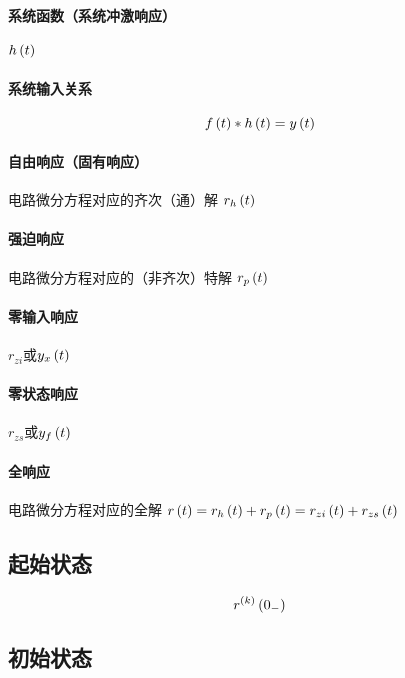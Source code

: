 \documentclass{article}
\begin{document}
\paragraph{系统函数（系统冲激响应）}

$h\left(t\right)$

\paragraph{系统输入关系}

\[f\left(t\right)\ast h\left(t\right)=y\left(t\right)\]

\paragraph{自由响应（固有响应）}

电路微分方程对应的齐次（通）解
$r_h\left(t\right)$

\paragraph{强迫响应}

电路微分方程对应的（非齐次）特解
$r_p\left(t\right)$

\paragraph{零输入响应}

$r_{zi}$或$y_x\left(t\right)$

\paragraph{零状态响应}

$r_{zs}$或$y_f\left(t\right)$

\paragraph{全响应}

电路微分方程对应的全解
$r\left(t\right)=r_h\left(t\right)+r_p\left(t\right)=r_{zi}\left(t\right)+r_{zs}\left(t\right)$

\subsection{起始状态}

\[r^{\left(k\right)}\left(0_-\right)\]

\subsection{初始状态}
\end{document}
